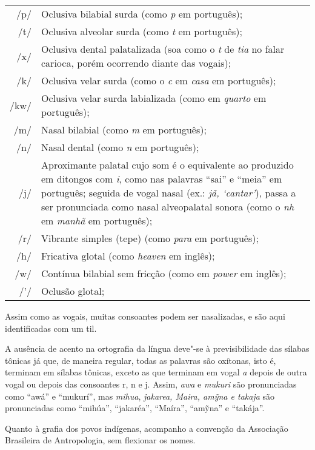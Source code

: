 \begin{tabular}{rl}
/p/ & Oclusiva bilabial surda (como \emph{p} em português);\\
/t/ & Oclusiva alveolar surda (como \emph{t} em português);\\
/x/ & \parbox{.85\textwidth}{Oclusiva dental palatalizada (soa como o \emph{t} de \emph{tia} no falar carioca, porém ocorrendo diante das vogais);}\\
/k/ & Oclusiva velar surda (como o \emph{c} em \emph{casa} em português);\\
/kw/ & \parbox{.85\textwidth}{Oclusiva velar surda labializada (como em \emph{quarto} em português);}\\
/m/ & Nasal bilabial (como \emph{m} em português);\\
/n/ & Nasal dental (como \emph{n} em português);\\
/j/ & \parbox{.85\textwidth}{Aproximante palatal cujo som é o equivalente ao produzido em ditongos com \emph{i}, como nas palavras ``sai'' e ``meia'' em português; seguida de vogal nasal (ex.: \emph{jã, `cantar'}), passa a ser pronunciada como nasal alveopalatal sonora (como o \emph{nh} em \emph{manhã} em português);}\\
/r/ & Vibrante simples (tepe) (como \emph{para} em português);\\
/h/ & Fricativa glotal (como \emph{heaven} em inglês);\\
/w/ & Contínua bilabial sem fricção (como em \emph{power} em inglês);\\
/'/ & Oclusão glotal;
\end{tabular}

\medskip

Assim como as vogais, muitas consoantes podem ser nasalizadas, e são
aqui identificadas com um til.

A ausência de acento na ortografia da língua deve"-se à previsibilidade
das sílabas tônicas já que, de maneira regular, todas as palavras são
oxítonas, isto é, terminam em sílabas tônicas, exceto as que terminam em
vogal \emph{a} depois de outra vogal ou depois das consoantes r, n e j.
Assim, \emph{awa} e \emph{mukuri} são pronunciadas como ``awá'' e
``mukurí'', mas \emph{mihua}, \emph{jakarea, Maira, amỹna e takaja} são
pronunciadas como ``mihúa'', ``jakaréa'', ``Maíra'', ``amỹna'' e
``takája''.

Quanto à grafia dos povos indígenas, acompanho a convenção da Associação
Brasileira de Antropologia, sem flexionar os nomes.


